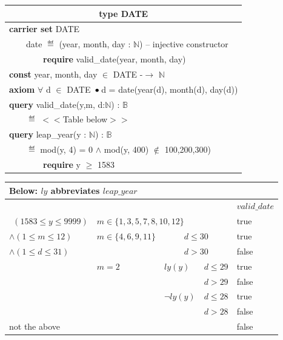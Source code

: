 \documentclass[runningheads,12pt]{article}
\begin{document}
\begin{table}[H]
{
\centering
\begin{tabular}{|l|}

\hline
\multicolumn{1}{|c|}{\textbf{type DATE}}\\

\hline
\textbf{carrier set} DATE\\
$\qquad$date $\eqdef$ (year, month, day : $\mathbb{N}$)    -- injective constructor\\
$\qquad$$\qquad$\textbf{require} valid\_date(year, month, day)\\
\textbf{const} year, month, day $\in$ DATE -$\rightarrow$  $\mathbb{N}$\\
\textbf{axiom} $\forall$ d $\in$ DATE $ \,\bullet\,$d = date(year(d), month(d), day(d))\\
\textbf{query} valid\_date(y,m, d:$\mathbb{N}$) : $\mathbb{B}$\\
$\qquad$$\eqdef$ $<$$<$Table below$>$$>$\\
\textbf{query} leap\_year(y : $\mathbb{N}$) : $\mathbb{B}$\\
$\qquad$$\eqdef$ mod(y, 4) = 0 $\land$ mod(y, 400) $\notin$ {100,200,300)}\\
$\qquad$$\qquad$\textbf{require} y $\ge$ 1583\\


\hline
\end{tabular}
}
\end{table}


\begin{table}[H]
{
\centering
\begin{tabular}{|l|l|l|l|l|}
\multicolumn{5}{l}{Below: $ly$ abbreviates $leap\_year$}\\
\hline
\multicolumn{4}{|c|}{} & $valid\_date$ \\ 
\hline
$~~ (1583 \leq y \leq 9999)$ & \multicolumn{3}{l|}{$m\in \{1,3,5,7,8,10,12\}$} &true\\ 
\cline{2-5}

$\land (1 \leq m \leq  12)$ & $m\in \{4,6,9,11\}$ & \multicolumn{2}{c|}{$d \leq 30$} &true \\ 
\cline{3-5}
$\land (1 \leq d \leq 31)$ &  & \multicolumn{2}{c|}{$d>30$} &false\\ 
\cline{2-5}

& $m=2$ & $ly(y)$ & $d\leq 29$ &true\\ 
\cline{4-5}
&  &  & $d>29$ &false\\ 
\cline{3-5}
&  & $\lnot ly(y)$ & $d\leq 28$ &true\\ 
\cline{4-5}
&  &  & $d>28$ &false\\ 
\cline{1-5}
\multicolumn{4}{|l|}{not the above } &false\\ 
\hline
\end{tabular}
}
\end{table}

\end{document}
